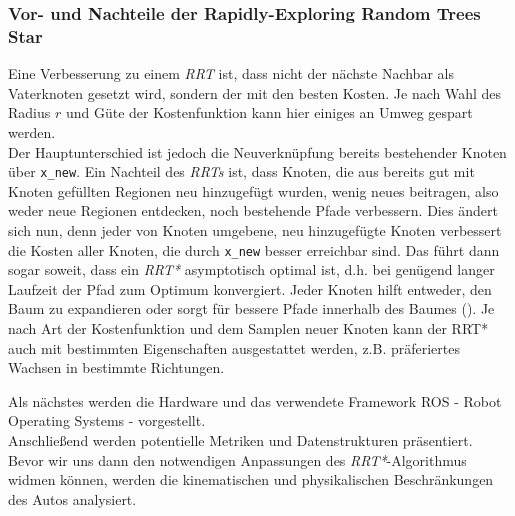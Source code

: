 \subsubsection{Vor- und Nachteile der Rapidly-Exploring Random Trees Star}
\label{sec:rrt*}
Eine Verbesserung zu einem \textit{RRT} ist, dass nicht der nächste Nachbar als Vaterknoten gesetzt wird, sondern der mit den besten Kosten. Je nach Wahl des Radius $r$ und Güte der Kostenfunktion kann hier einiges an \glqq Umweg\grqq{} gespart werden. \\
Der Hauptunterschied ist jedoch die Neuverknüpfung bereits bestehender Knoten über \verb|x_new|. Ein Nachteil des \textit{RRTs} ist, dass Knoten, die aus bereits gut mit Knoten gefüllten Regionen neu hinzugefügt wurden, wenig neues beitragen, also weder neue Regionen entdecken, noch bestehende Pfade verbessern. Dies ändert sich nun, denn jeder von Knoten umgebene, neu hinzugefügte Knoten verbessert die Kosten aller Knoten, die durch \verb|x_new| besser erreichbar sind. Das führt dann sogar soweit, dass ein \textit{RRT*} asymptotisch optimal ist, d.h. bei genügend langer Laufzeit der Pfad zum Optimum konvergiert. Jeder Knoten hilft entweder, den Baum zu expandieren oder sorgt für bessere Pfade innerhalb des Baumes (\citep[vgl. Kapitel 5 in][]{KaFra10}). Je nach Art der Kostenfunktion und dem Samplen neuer Knoten kann der RRT* auch mit bestimmten Eigenschaften ausgestattet werden, z.B. präferiertes Wachsen in bestimmte Richtungen.

Als nächstes werden die Hardware und das verwendete Framework ROS - Robot Operating Systems - vorgestellt. \\
Anschließend werden potentielle Metriken und Datenstrukturen präsentiert.
Bevor wir uns dann den notwendigen Anpassungen des \textit{RRT*}-Algorithmus widmen können, werden die kinematischen und physikalischen Beschränkungen des Autos analysiert.
